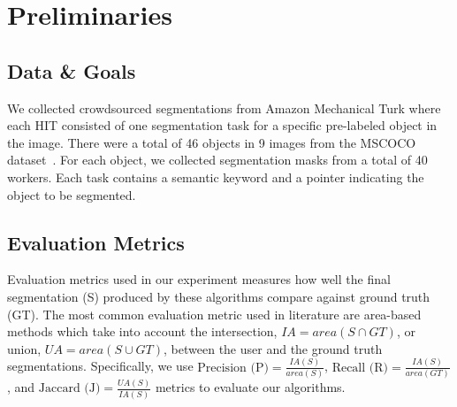 \section{Preliminaries}
\subsection{Data \& Goals}
We collected crowdsourced segmentations from Amazon Mechanical Turk where each HIT consisted of one segmentation task for a specific pre-labeled object in the image. There were a total of 46 objects in 9 images from the MSCOCO dataset~\cite{Lin2014}. For each object, we collected segmentation masks from a total of 40 workers. Each task contains a semantic keyword and a pointer indicating the object to be segmented. %
\subsection{Evaluation Metrics}
\par Evaluation metrics used in our experiment measures how well the final segmentation (S) produced by these algorithms compare against ground truth (GT). The most common evaluation metric used in literature are area-based methods which take into account the intersection, $IA=area(S\cap GT)$, or union, $UA=area(S\cup GT)$, between the user and the ground truth segmentations. Specifically, we use
    $\text{Precision (P)} = \frac{IA(S)}{area(S)}$, 
    $\text{Recall (R)} = \frac{IA(S)}{area(GT)}$, and 
    $\text{Jaccard (J)} = \frac{UA(S)}{IA(S)}$
    metrics to evaluate our algorithms.

